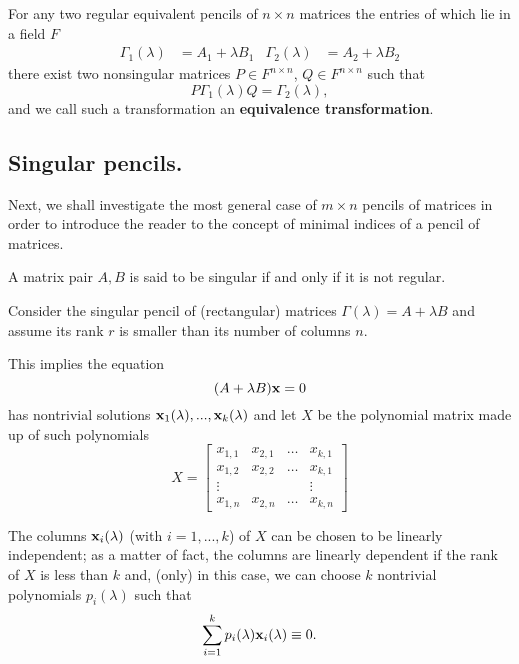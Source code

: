 \begin{lemma} \cite[Equation 2.14]{ikramov}
    For any two regular equivalent pencils of \(n \times n\) matrices the entries of which lie in a field \(F\)
    \begin{align*}
        \Gamma_{1}(\lambda) &= A_{1} + \lambda B_{1} &
        \Gamma_{2}(\lambda) &= A_{2} + \lambda B_{2}
    \end{align*}
    there exist two nonsingular matrices \(P \in F^{n \times n}\), \(Q \in F^{n \times n}\) such that
    \[
        P \Gamma_{1}(\lambda) Q = \Gamma_{2}(\lambda),
    \]
    and we call such a transformation an \textbf{equivalence transformation}.
\end{lemma}

\subsection*{Singular pencils.}
Next, we shall investigate the most general case of \(m \times n\) pencils of matrices in order to introduce
the reader to the concept of minimal indices of a pencil of matrices.
\begin{definition}\cite[p. 25, Definition 2]{gantmacher}
    A matrix pair \(A, B\) is said to be singular if and only if it is not regular.
\end{definition}

Consider the singular pencil of (rectangular) matrices \(\Gamma(\lambda) = A + \lambda B\) and assume its rank \(r\) is smaller
than its number of columns \(n\).

This implies the equation
\[
    (A + \lambda B) \vb{x} = 0
\]
has nontrivial solutions \(\vb{x}_{1}(\lambda), ..., \vb{x}_{k}(\lambda)\) and let \(X\) be the polynomial
matrix made up of such polynomials
\[
    X =
    \begin{bmatrix}
        x_{1, 1} & x_{2, 1} & \ldots & x_{k, 1} \\
        x_{1, 2} & x_{2, 2} & \ldots & x_{k, 1} \\
        \vdots   &          &        &   \vdots \\
        x_{1, n} & x_{2, n} & \ldots & x_{k, n}
    \end{bmatrix}
\]

The columns \(\vb{x}_{i}(\lambda)\) (with \(i = 1, ..., k\)) of \(X\) can be chosen to be linearly independent; as a matter of
fact, the columns are linearly dependent if the rank of \(X\) is less than \(k\) and, (only) in this case, we can
choose \(k\) nontrivial polynomials \(p_{i}(\lambda)\) such that
\[
    \sum_{i=1}^{k} p_{i}(\lambda) \vb{x}_{i}(\lambda) \equiv 0.
\]


